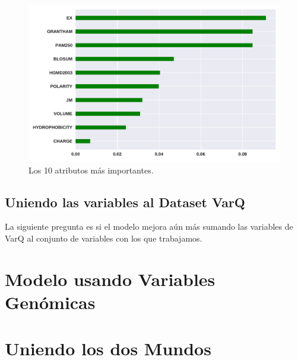 \begin{figure}[H]
    \centering
    \includegraphics[scale=0.73]{documents/latex/figures/3/importance_1.pdf}
    \caption{Los 10 atributos más importantes.}
    \label{fig:importance_1}
\end{figure}


\subsection{Uniendo las variables al Dataset VarQ}

La siguiente pregunta es si el modelo mejora aún más sumando las variables de VarQ al conjunto de variables con los que trabajamos.



\section{Modelo usando Variables Genómicas}


\section{Uniendo los dos Mundos}

